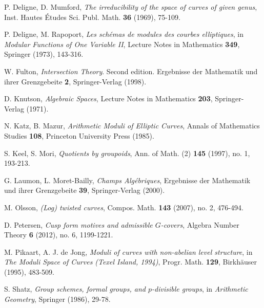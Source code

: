 \documentclass[11pt]{amsart}
\theoremstyle{definition}
\begin{document}
\begin{thebibliography}{999999}
 P. Deligne, D. Mumford, \textit{The irreducibility of the space of curves of given genus}, Inst. Hautes \'Etudes Sci. Publ. Math. \textbf{36} (1969), 75-109.

 P. Deligne, M. Rapoport, \textit{Les sch\'emas de modules des courbes elliptiques}, in \textit{Modular Functions of One Variable II}, Lecture Notes in Mathematics \textbf{349}, Springer (1973), 143-316.

 W. Fulton, \textit{Intersection Theory}. Second edition. Ergebnisse der Mathematik und ihrer Grenzgebeite \textbf{2}, Springer-Verlag (1998).

 D. Knutson, \textit{Algebraic Spaces}, Lecture Notes in Mathematics \textbf{203}, Springer-Verlag (1971).

 N. Katz, B. Mazur, \textit{Arithmetic Moduli of Elliptic Curves}, Annals of Mathematics Studies \textbf{108}, Princeton University Press (1985).

 S. Keel, S. Mori, \textit{Quotients by groupoids}, Ann. of Math. (2) \textbf{145} (1997), no. 1, 193-213.

 G. Laumon, L. Moret-Bailly, \textit{Champs Alg\'ebriques}, Ergebnisse der Mathematik und ihrer Grenzgebeite \textbf{39}, Springer-Verlag (2000).

 M. Olsson, \textit{(Log) twisted curves}, Compos. Math. \textbf{143} (2007), no. 2, 476-494.

 D. Petersen, \textit{Cusp form motives and admissible $G$-covers}, Algebra Number Theory \textbf{6} (2012), no. 6, 1199-1221.

 M. Pikaart, A. J. de Jong, \textit{Moduli of curves with non-abelian level structure}, in \textit{The Moduli Space of Curves (Texel Island, 1994)}, Progr. Math. \textbf{129}, Birkh\"auser (1995), 483-509.

 S. Shatz, \textit{Group schemes, formal groups, and $p$-divisible groups}, in \textit{Arithmetic Geometry}, Springer (1986), 29-78.

\end{thebibliography}
\end{document}
